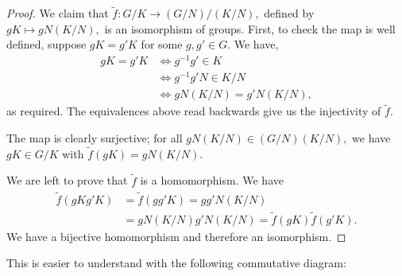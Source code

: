 \begin{proof}


  We claim that  $\widetilde{f}: G/K \to (G/N)/(K/N),$ defined by $gK\mapsto gN(K/N),$ is an isomorphism of groups.
  First, to check the map is well defined, suppose $gK=g'K$ for some $g,g'\in G$. We have,
  \begin{align*}
      gK=g'K &\iff g^{-1}g'\in K
      \\ &\iff g^{-1}g' N \in K/N
      \\ &\iff gN(K/N) = g'N(K/N),
  \end{align*}
  as required. 
  The equivalences above read backwards give us the injectivity of $\widetilde{f}$. 
  
  The map is clearly surjective; for all $gN(K/N)\in (G/N)(K/N),$ we have $gK\in G/K$ with $\widetilde{f}(gK)=gN(K/N).$ 


  We are left to prove that $\widetilde{f}$ is a homomorphism. We have
  \begin{align*}
      \widetilde{f}(gKg'K)&=\widetilde{f}(gg'K)=gg'N(K/N)
      \\&=gN(K/N)g'N(K/N)=\widetilde{f}(gK)\widetilde{f}(g'K).
  \end{align*}
  We have a bijective homomorphism and therefore an isomorphism.
\end{proof}

This is easier to understand with the following commutative diagram:

